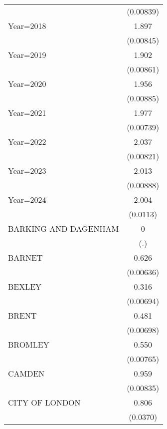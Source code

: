 {\begin{longtable}{l*{1}{c}}
                    &   (0.00839)         \\
\addlinespace
Year=2018           &       1.897\sym{***}\\
                    &   (0.00845)         \\
\addlinespace
Year=2019           &       1.902\sym{***}\\
                    &   (0.00861)         \\
\addlinespace
Year=2020           &       1.956\sym{***}\\
                    &   (0.00885)         \\
\addlinespace
Year=2021           &       1.977\sym{***}\\
                    &   (0.00739)         \\
\addlinespace
Year=2022           &       2.037\sym{***}\\
                    &   (0.00821)         \\
\addlinespace
Year=2023           &       2.013\sym{***}\\
                    &   (0.00888)         \\
\addlinespace
Year=2024           &       2.004\sym{***}\\
                    &    (0.0113)         \\
\addlinespace
BARKING AND DAGENHAM&           0         \\
                    &         (.)         \\
\addlinespace
BARNET              &       0.626\sym{***}\\
                    &   (0.00636)         \\
\addlinespace
BEXLEY              &       0.316\sym{***}\\
                    &   (0.00694)         \\
\addlinespace
BRENT               &       0.481\sym{***}\\
                    &   (0.00698)         \\
\addlinespace
BROMLEY             &       0.550\sym{***}\\
                    &   (0.00765)         \\
\addlinespace
CAMDEN              &       0.959\sym{***}\\
                    &   (0.00835)         \\
\addlinespace
CITY OF LONDON      &       0.806\sym{***}\\
                    &    (0.0370)         \\

\end{longtable}}
